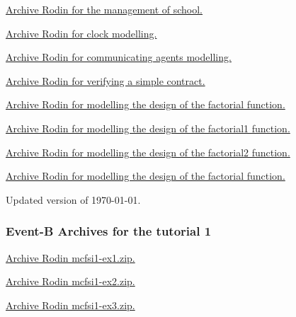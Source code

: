 \documentclass[ 12pt]{article}
\begin{document}
 \href{http://mery54.github.io/teaching/mosos/models/mcfsi0-school.zip}{Archive Rodin  for   the management of school. }

 
 


  \href{http://mery54.github.io/teaching/mosos/models/mcfsi0-clock.zip}{Archive Rodin  for  clock modelling. }


  \href{http://mery54.github.io/teaching/mosos/models/mcfsi0-agents.zip}{Archive
    Rodin  for  communicating agents modelling. }


 \href{http://mery54.github.io/teaching/mosos/models/mcfsi0-alg-simple.zip}{Archive
    Rodin  for  verifying a simple contract. }


  \href{http://mery54.github.io/teaching/mosos/models/mcfsi0-factorial.zip}{Archive Rodin  for   modelling  the 
   design of the factorial function.}

 
  \href{http://mery54.github.io/teaching/mosos/models/mcfsi0-factorial1.zip}{Archive Rodin  for   modelling  the 
   design of the factorial1 function.}

 
  \href{http://mery54.github.io/teaching/mosos/models/mcfsi0-factorial2.zip}{Archive Rodin  for   modelling  the 
   design of the factorial2 function.}
  

 
  \href{http://mery54.github.io/teaching/mosos/models/factorial-plugin-tutO.zip}{Archive Rodin  for   modelling  the 
   design of the factorial function.}


 Updated version of \today.


 


 \subsubsection{Event-B Archives for   the tutorial 1}
\label{sec:event-b-archives}

\href{http://mery54.github.io/teaching/mosos/models/mcfsi1-ex1.zip}{Archive
  Rodin   mcfsi1-ex1.zip.}

\href{http://mery54.github.io/teaching/mosos/models/mcfsi1-ex2.zip}{Archive
  Rodin   mcfsi1-ex2.zip.}



\href{http://mery54.github.io/teaching/mosos/models/mcfsi1-ex3.zip}{Archive
  Rodin   mcfsi1-ex3.zip.}
\end{document}
